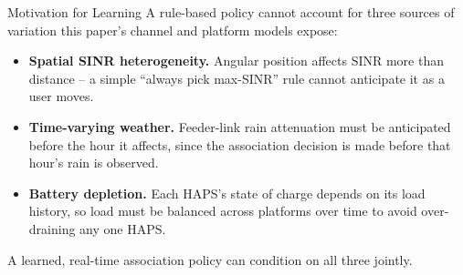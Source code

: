 \documentclass[aspectratio=169]{beamer}
\begin{document}
\begin{frame}{Motivation for Learning}
\footnotesize
A rule-based policy cannot account for three sources of variation this
paper's channel and platform models expose:
\begin{itemize}
  \item \textbf{Spatial SINR heterogeneity.} Angular position affects
        SINR more than distance -- a simple ``always pick max-SINR''
        rule cannot anticipate it as a user moves.
  \item \textbf{Time-varying weather.} Feeder-link rain attenuation
        must be anticipated before the hour it affects, since the
        association decision is made before that hour's rain is
        observed.
  \item \textbf{Battery depletion.} Each HAPS's state of charge
        depends on its load history, so load must be balanced across
        platforms over time to avoid over-draining any one HAPS.
\end{itemize}
A learned, real-time association policy can condition on all three
jointly.
\end{frame}
\end{document}
